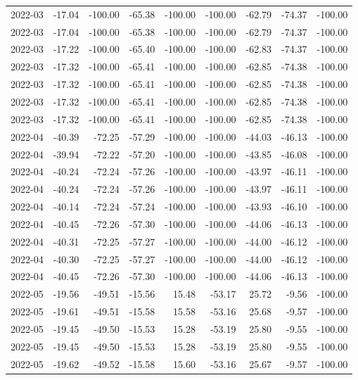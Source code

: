 \begin{table}[ht]
\begin{tabular}{lrrrrrrrr}
  2022-03 & -17.04 & -100.00 & -65.38 & -100.00 & -100.00 & -62.79 & -74.37 & -100.00 \\ 
  2022-03 & -17.04 & -100.00 & -65.38 & -100.00 & -100.00 & -62.79 & -74.37 & -100.00 \\ 
  2022-03 & -17.22 & -100.00 & -65.40 & -100.00 & -100.00 & -62.83 & -74.37 & -100.00 \\ 
  2022-03 & -17.32 & -100.00 & -65.41 & -100.00 & -100.00 & -62.85 & -74.38 & -100.00 \\ 
  2022-03 & -17.32 & -100.00 & -65.41 & -100.00 & -100.00 & -62.85 & -74.38 & -100.00 \\ 
  2022-03 & -17.32 & -100.00 & -65.41 & -100.00 & -100.00 & -62.85 & -74.38 & -100.00 \\ 
  2022-03 & -17.32 & -100.00 & -65.41 & -100.00 & -100.00 & -62.85 & -74.38 & -100.00 \\ 
  2022-04 & -40.39 & -72.25 & -57.29 & -100.00 & -100.00 & -44.03 & -46.13 & -100.00 \\ 
  2022-04 & -39.94 & -72.22 & -57.20 & -100.00 & -100.00 & -43.85 & -46.08 & -100.00 \\ 
  2022-04 & -40.24 & -72.24 & -57.26 & -100.00 & -100.00 & -43.97 & -46.11 & -100.00 \\ 
  2022-04 & -40.24 & -72.24 & -57.26 & -100.00 & -100.00 & -43.97 & -46.11 & -100.00 \\ 
  2022-04 & -40.14 & -72.24 & -57.24 & -100.00 & -100.00 & -43.93 & -46.10 & -100.00 \\ 
  2022-04 & -40.45 & -72.26 & -57.30 & -100.00 & -100.00 & -44.06 & -46.13 & -100.00 \\ 
  2022-04 & -40.31 & -72.25 & -57.27 & -100.00 & -100.00 & -44.00 & -46.12 & -100.00 \\ 
  2022-04 & -40.30 & -72.25 & -57.27 & -100.00 & -100.00 & -44.00 & -46.12 & -100.00 \\ 
  2022-04 & -40.45 & -72.26 & -57.30 & -100.00 & -100.00 & -44.06 & -46.13 & -100.00 \\ 
  2022-05 & -19.56 & -49.51 & -15.56 & 15.48 & -53.17 & 25.72 & -9.56 & -100.00 \\ 
  2022-05 & -19.61 & -49.51 & -15.58 & 15.58 & -53.16 & 25.68 & -9.57 & -100.00 \\ 
  2022-05 & -19.45 & -49.50 & -15.53 & 15.28 & -53.19 & 25.80 & -9.55 & -100.00 \\ 
  2022-05 & -19.45 & -49.50 & -15.53 & 15.28 & -53.19 & 25.80 & -9.55 & -100.00 \\ 
  2022-05 & -19.62 & -49.52 & -15.58 & 15.60 & -53.16 & 25.67 & -9.57 & -100.00 \\ 

\end{tabular}
\end{table}
